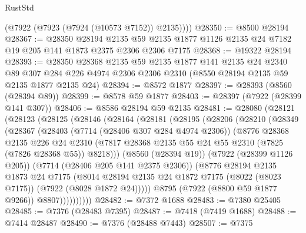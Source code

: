 \begin{lexlean}{RustStd}
\begin{coremodule}
        (@7922 (@7923 (@7924 (@10573 @7152)) @2135))))
@28350 := @8500 @28194
@28367 := @28350
    @28194
    @2135
    @59
    @2135
    @1877
    @1126
    @2135
    @24
    @7182
    @19
    @205
    @141
    @1873
    @2375
    @2306
    @2306
    @7175
@28368 := @19322 @28194
@28393 := @28350
    @28368
    @2135
    @59
    @2135
    @1877
    @141
    @2135
    @24
    @2340
    @89
    @307
    @284
    @226
    @4974
    @2306
    @2306
    @2310
    (@8550 @28194 @2135 @59 @2135 @1877 @2135 @24)
@28394 := @8572 @1877
@28397 := @28393 (@8560 (@28394 @89))
@28399 := @8578 @59 @1877
@28403 := @28397 (@7922 (@28399 @141 @307))
@28406 := @8586 @28194 @59 @2135
@28481 := @28080
    (@28121
      (@28123
        (@28125
          (@28146
            (@28164
              (@28181
                (@28195
                  (@28206
                    (@28210
                      (@28349
                        (@28367
                          (@28403
                            (@7714 (@28406 @307 @284 @4974 @2306))
                            (@8776
                              @28368
                              @2135
                              @226
                              @24
                              @2310
                              (@7817
                                @28368
                                @2135
                                @55
                                @24
                                @55
                                @2310
                                (@7825 (@7826 @28368 @55))
                                @8218)))
                          (@8560 (@28394 @19))
                          (@7922 (@28399 @1126 @205))
                          (@7714 (@28406 @205 @141 @2375 @2306))
                          (@8776
                            @28194
                            @2135
                            @1873
                            @24
                            @7175
                            (@8014
                              @28194
                              @2135
                              @24
                              @1872
                              @7175
                              (@8022 (@8023 @7175))
                              (@7922 (@8028 @1872 @24)))))
                        @8795
                        (@7922 (@8800 @59 @1877 @9266))
                        @8807))))))))))
@28482 := @7372 @1688
@28483 := @7380 @25405
@28485 := @7376 (@28483 @7395)
@28487 := @7418 (@7419 @1688)
@28488 := @7414 @28487
@28490 := @7376 (@28488 @7443)
@28507 := @7375

\end{coremodule}
\end{lexlean}
